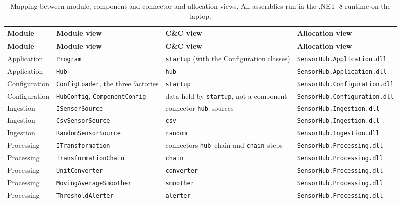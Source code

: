 \documentclass[../main-en.tex]{subfiles}
\begin{document}
\begingroup
\scriptsize
\begin{xltabular}{\textwidth}{| l | L | L | l |}
  \caption{Mapping between module, component-and-connector and allocation
  views. All assemblies run in the .NET~8 runtime on the laptop.}
  \label{tab:mapping}\\
  \hline
  \textbf{Module} & \textbf{Module view} & \textbf{C\&C view} &
  \textbf{Allocation view} \\
  \hline
  \endfirsthead
  \hline
  \textbf{Module} & \textbf{Module view} & \textbf{C\&C view} &
  \textbf{Allocation view} \\
  \hline
  \endhead
  \hline
  \endfoot
  \hline
  \endlastfoot
  Application & \texttt{Program} & \texttt{startup} (with the
  Configuration classes) & \texttt{SensorHub.Application.dll} \\
  \hline
  Application & \texttt{Hub} & \texttt{hub} & \texttt{SensorHub.Application.dll} \\
  \hline
  Configuration & \texttt{ConfigLoader}, the three factories &
  \texttt{startup} & \texttt{SensorHub.Configuration.dll} \\
  \hline
  Configuration & \texttt{HubConfig}, \texttt{ComponentConfig} & data held
  by \texttt{startup}, not a component & \texttt{SensorHub.Configuration.dll} \\
  \hline
  Ingestion & \texttt{ISensorSource} & connector \texttt{hub}--sources &
  \texttt{SensorHub.Ingestion.dll} \\
  \hline
  Ingestion & \texttt{CsvSensorSource} & \texttt{csv} & \texttt{SensorHub.Ingestion.dll} \\
  \hline
  Ingestion & \texttt{RandomSensorSource} & \texttt{random} & \texttt{SensorHub.Ingestion.dll} \\
  \hline
  Processing & \texttt{ITransformation} & connectors \texttt{hub}--chain
  and \texttt{chain}--steps & \texttt{SensorHub.Processing.dll} \\
  \hline
  Processing & \texttt{TransformationChain} & \texttt{chain} & \texttt{SensorHub.Processing.dll} \\
  \hline
  Processing & \texttt{UnitConverter} & \texttt{converter} & \texttt{SensorHub.Processing.dll} \\
  \hline
  Processing & \texttt{MovingAverageSmoother} & \texttt{smoother} & \texttt{SensorHub.Processing.dll} \\
  \hline
  Processing & \texttt{ThresholdAlerter} & \texttt{alerter} & \texttt{SensorHub.Processing.dll} \\

\end{xltabular}
\end{document}
